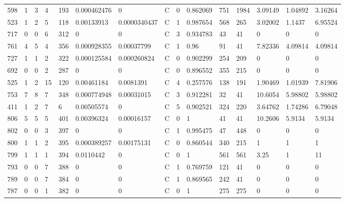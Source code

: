 \begin{latin}
\begin{longtable}{lllllllllllllll}
	598 & 1  & 3   & 4  & 193 & 0.000462476    & 0              & C & 0  & 0.862069 & 751  & 1984 & 3.09149 & 1.04892 & 3.16264 \\
	523 & 1  & 2   & 5  & 118 & 0.00133913     & 0.0000340437   & C & 1  & 0.987654 & 568  & 265  & 3.02002 & 1.1437  & 6.95524 \\
	717 & 0  & 0   & 6  & 312 & 0              & 0              & C & 3  & 0.934783 & 43   & 41   & 0       & 0       & 0       \\
	761 & 4  & 5   & 4  & 356 & 0.000928355    & 0.00037799     & C & 1  & 0.96     & 91   & 41   & 7.82336 & 4.09814 & 4.09814 \\
	727 & 1  & 1   & 2  & 322 & 0.000125584    & 0.000260824    & C & 0  & 0.902299 & 254  & 209  & 0       & 0       & 0       \\
	692 & 0  & 0   & 2  & 287 & 0              & 0              & C & 0  & 0.896552 & 355  & 215  & 0       & 0       & 0       \\
	525 & 1  & 2   & 15 & 120 & 0.00461184     & 0.0081391      & C & 4  & 0.257576 & 138  & 191  & 1.90469 & 1.01939 & 7.81906 \\
	753 & 7  & 8   & 7  & 348 & 0.000774948    & 0.00031015     & C & 3  & 0.912281 & 32   & 41   & 10.6054 & 5.98802 & 5.98802 \\
	411 & 1  & 2   & 7  & 6   & 0.00505574     & 0              & C & 5  & 0.902521 & 324  & 220  & 3.64762 & 1.74286 & 6.79048 \\
	806 & 5  & 5   & 5  & 401 & 0.00396324     & 0.00016157     & C & 0  & 1        & 41   & 41   & 10.2606 & 5.9134  & 5.9134  \\
	802 & 0  & 0   & 3  & 397 & 0              & 0              & C & 1  & 0.995475 & 47   & 448  & 0       & 0       & 0       \\
	800 & 1  & 1   & 2  & 395 & 0.000389257    & 0.00175131     & C & 0  & 0.860544 & 340  & 215  & 1       & 1       & 1       \\
	799 & 1  & 1   & 1  & 394 & 0.0110442      & 0              & C & 0  & 1        & 561  & 561  & 3.25    & 1       & 11      \\
	793 & 0  & 0   & 7  & 388 & 0              & 0              & C & 1  & 0.769759 & 121  & 41   & 0       & 0       & 0       \\
	789 & 0  & 0   & 7  & 384 & 0              & 0              & C & 1  & 0.869565 & 242  & 41   & 0       & 0       & 0       \\
	787 & 0  & 0   & 1  & 382 & 0              & 0              & C & 0  & 1        & 275  & 275  & 0       & 0       & 0       \\

\end{longtable}
\end{latin}
